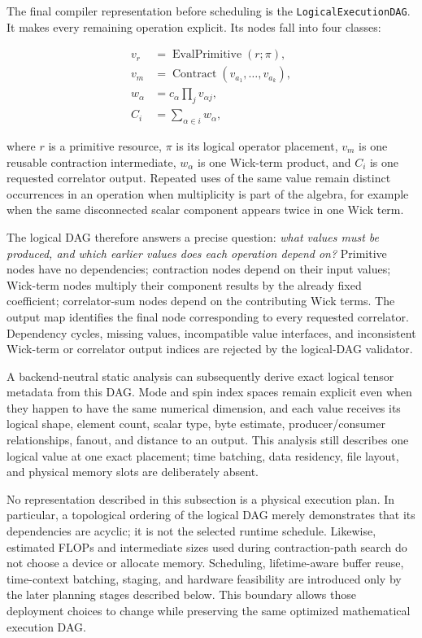 \documentclass[11pt]{article}
\begin{document}
The final compiler representation before scheduling is the
\texttt{LogicalExecutionDAG}. It makes every remaining operation explicit. Its
nodes fall into four classes:

\begin{equation}
\begin{aligned}
v_r & = \operatorname{EvalPrimitive}(r;\pi),\\
v_m & = \operatorname{Contract}(v_{a_1},\ldots,v_{a_k}),\\
w_\alpha & = c_\alpha\prod_j v_{\alpha j},\\
C_i & = \sum_{\alpha\in i} w_\alpha,
\end{aligned}
\label{eq:logical_execution_node_classes}
\end{equation}

where \(r\) is a primitive resource, \(\pi\) is its logical operator placement,
\(v_m\) is one reusable contraction intermediate, \(w_\alpha\) is one Wick-term
product, and \(C_i\) is one requested correlator output. Repeated uses of the
same value remain distinct occurrences in an operation when multiplicity is
part of the algebra, for example when the same disconnected scalar component
appears twice in one Wick term.

The logical DAG therefore answers a precise question: \emph{what values must be
produced, and which earlier values does each operation depend on?} Primitive
nodes have no dependencies; contraction nodes depend on their input values;
Wick-term nodes multiply their component results by the already fixed
coefficient; correlator-sum nodes depend on the contributing Wick terms. The
output map identifies the final node corresponding to every requested
correlator. Dependency cycles, missing values, incompatible value interfaces,
and inconsistent Wick-term or correlator output indices are rejected by the
logical-DAG validator.

A backend-neutral static analysis can subsequently derive exact logical tensor
metadata from this DAG. Mode and spin index spaces remain explicit even when
they happen to have the same numerical dimension, and each value receives its
logical shape, element count, scalar type, byte estimate, producer/consumer
relationships, fanout, and distance to an output. This analysis still describes
one logical value at one exact placement; time batching, data residency, file
layout, and physical memory slots are deliberately absent.

No representation described in this subsection is a physical execution plan.
In particular, a topological ordering of the logical DAG merely demonstrates
that its dependencies are acyclic; it is not the selected runtime schedule.
Likewise, estimated FLOPs and intermediate sizes used during contraction-path
search do not choose a device or allocate memory. Scheduling, lifetime-aware
buffer reuse, time-context batching, staging, and hardware feasibility are
introduced only by the later planning stages described below. This boundary
allows those deployment choices to change while preserving the same optimized
mathematical execution DAG.
\end{document}
